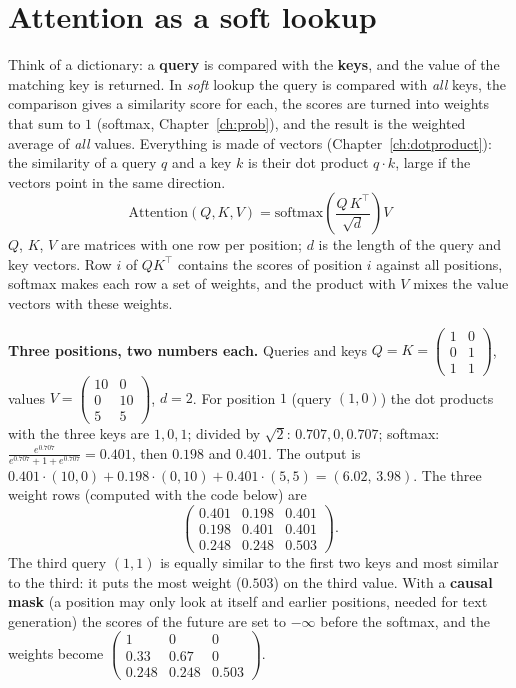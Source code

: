 \section*{Attention as a soft lookup}
Think of a dictionary: a \textbf{query} is compared with the \textbf{keys}, and the value of the matching key is returned. In \emph{soft} lookup the query is compared with \emph{all} keys, the comparison gives a similarity score for each, the scores are turned into weights that sum to $1$ (softmax, Chapter~\ref{ch:prob}), and the result is the weighted average of \emph{all} values. Everything is made of vectors (Chapter~\ref{ch:dotproduct}): the similarity of a query $q$ and a key $k$ is their dot product $q\cdot k$, large if the vectors point in the same direction.
\[
\mathrm{Attention}(Q,K,V)=\mathrm{softmax}\!\left(\frac{Q\,K^{\top}}{\sqrt{d}}\right)V
\]
$Q$, $K$, $V$ are matrices with one row per position; $d$ is the length of the query and key vectors. Row $i$ of $QK^\top$ contains the scores of position $i$ against all positions, softmax makes each row a set of weights, and the product with $V$ mixes the value vectors with these weights.
\begin{example}
\textbf{Three positions, two numbers each.} Queries and keys $Q=K=\begin{pmatrix}1&0\\0&1\\1&1\end{pmatrix}$, values $V=\begin{pmatrix}10&0\\0&10\\5&5\end{pmatrix}$, $d=2$. For position $1$ (query $(1,0)$) the dot products with the three keys are $1,0,1$; divided by $\sqrt2$: $0.707,0,0.707$; softmax: $\frac{e^{0.707}}{e^{0.707}+1+e^{0.707}}=0.401$, then $0.198$ and $0.401$. The output is $0.401\cdot(10,0)+0.198\cdot(0,10)+0.401\cdot(5,5)=(6.02,\,3.98)$. The three weight rows (computed with the code below) are
\[
\begin{pmatrix}0.401&0.198&0.401\\0.198&0.401&0.401\\0.248&0.248&0.503\end{pmatrix}.
\]
The third query $(1,1)$ is equally similar to the first two keys and most similar to the third: it puts the most weight ($0.503$) on the third value. With a \textbf{causal mask} (a position may only look at itself and earlier positions, needed for text generation) the scores of the future are set to $-\infty$ before the softmax, and the weights become $\begin{pmatrix}1&0&0\\0.33&0.67&0\\0.248&0.248&0.503\end{pmatrix}$.
\end{example}

